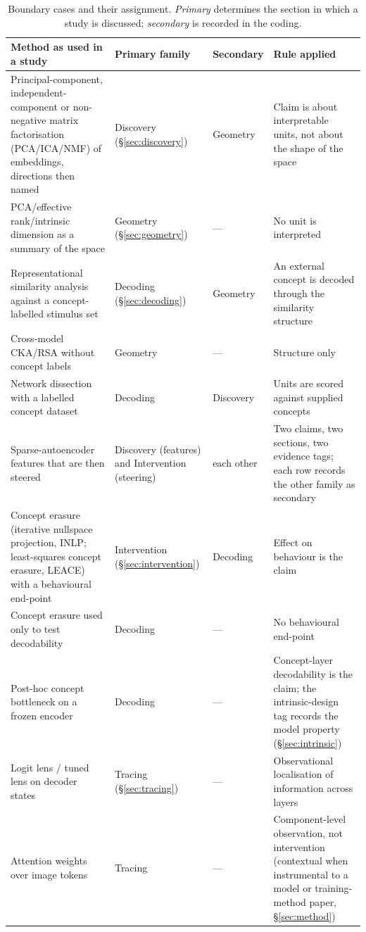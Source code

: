 \begin{table}[!tb]
\centering\small
\caption{Boundary cases and their assignment. \emph{Primary} determines the section in which a study is
discussed; \emph{secondary} is recorded in the coding.}
\label{tab:boundary}
\setlength\tabcolsep{4pt}\begin{tabular}{@{}L{5.4cm}L{2.8cm}L{1.9cm}L{5.2cm}@{}}
\toprule
Method as used in a study & Primary family & Secondary & Rule applied \\
\midrule
Principal-component, independent-component or non-negative matrix factorisation (PCA/ICA/NMF) of embeddings, directions then named & Discovery (\S\ref{sec:discovery}) & Geometry & Claim is about interpretable units, not about the shape of the space \\
PCA/effective rank/intrinsic dimension as a summary of the space & Geometry (\S\ref{sec:geometry}) & --- & No unit is interpreted \\
Representational similarity analysis against a concept-labelled stimulus set & Decoding (\S\ref{sec:decoding}) & Geometry & An external concept is decoded through the similarity structure \\
Cross-model CKA/RSA without concept labels & Geometry & --- & Structure only \\
Network dissection with a labelled concept dataset & Decoding & Discovery & Units are scored against supplied concepts \\
Sparse-autoencoder features that are then steered & Discovery (features) and Intervention (steering) & each other & Two claims, two sections, two evidence tags; each row records the other family as secondary \\
Concept erasure (iterative nullspace projection, INLP; least-squares concept erasure, LEACE) with a behavioural end-point & Intervention (\S\ref{sec:intervention}) & Decoding & Effect on behaviour is the claim \\
Concept erasure used only to test decodability & Decoding & --- & No behavioural end-point \\
Post-hoc concept bottleneck on a frozen encoder & Decoding & --- & Concept-layer decodability is the claim; the intrinsic-design tag records the model property (\S\ref{sec:intrinsic}) \\
Logit lens / tuned lens on decoder states & Tracing (\S\ref{sec:tracing}) & --- & Observational localisation of information across layers \\
Attention weights over image tokens & Tracing & --- & Component-level observation, not intervention (contextual when instrumental to a model or training-method paper, \S\ref{sec:method}) \\

\end{tabular}
\end{table}
